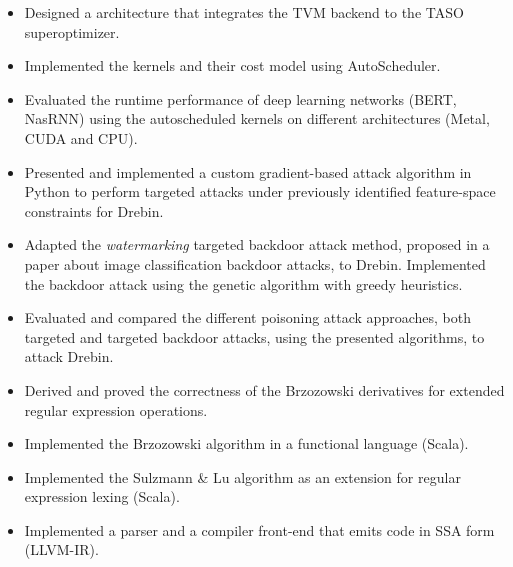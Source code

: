 \documentclass{resume}
\begin{document}
\begin{itemize}
  \item Designed a architecture that integrates the TVM backend to the TASO superoptimizer. 
  \item Implemented the kernels and their cost model using AutoScheduler. 
  \item Evaluated the runtime performance of deep learning networks (BERT, NasRNN) using the autoscheduled kernels on different architectures (Metal, CUDA and CPU). 
\end{itemize}

\begin{itemize}
  \item Presented and implemented a custom gradient-based attack algorithm in Python to perform targeted attacks under previously identified feature-space constraints for Drebin.
  \item Adapted the \textit{watermarking} targeted backdoor attack method, proposed in a paper about image classification backdoor attacks, to Drebin. Implemented the backdoor attack using the genetic algorithm with greedy heuristics.
  \item Evaluated and compared the different poisoning attack approaches, both targeted and targeted backdoor attacks, using the presented algorithms, to attack Drebin.
\end{itemize}

\begin{itemize}
  \item Derived and proved the correctness of the Brzozowski derivatives for extended regular expression operations.
  \item Implemented the Brzozowski algorithm in a functional language (Scala).
  \item Implemented the Sulzmann \& Lu algorithm as an extension for regular expression lexing (Scala).
  \item Implemented a parser and a compiler front-end that emits code in SSA form (LLVM-IR). 
\end{itemize}
\end{document}
